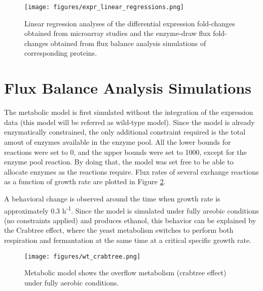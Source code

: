 \begin{figure}[H]
\begin{center}
\texttt{[image: figures/expr\_linear\_regressions.png]}
\caption[Linear regression analyses of the fold-changes]{Linear regression analyses of the differential expression fold-changes obtained from microarray studies and the enzyme-draw flux fold-changes obtained from flux balance analysis simulations of corresponding proteins.}
\end{center}
\label{fig:expr_linear_regressions}
\end{figure}



\section{Flux Balance Analysis Simulations}

The metabolic model is first simulated without the integration of the expression data (this model will be referred as wild-type model). Since the model is already enzymatically constrained, the only additional constraint required is the total amout of enzymes available in the enzyme pool. All the lower bounds for reactions were set to 0, and the upper bounds were set to 1000, except for the enzyme pool reaction. By doing that, the model was set free to be able to allocate enzymes as the reactions require. Flux rates of several exchange reactions as a function of growth rate are plotted in Figure \ref{fig:wt_crabtree}.

A behavioral change is observed around the time when growth rate is approximately 0.3 h\textsuperscript{-1}. Since the model is simulated under fully areobic conditions (no constraints applied) and produces ethanol, this behavior can be explained by the Crabtree effect, where the yeast metabolism switches to perform both respiration and fermantation at the same time at a critical specific growth rate.

\begin{figure}[H]
\begin{center}
\texttt{[image: figures/wt\_crabtree.png]}
\caption[Metabolic model shows the overflow metabolism]{Metabolic model shows the overflow metabolism (crabtree effect) under fully aerobic conditions.}
\end{center}
\label{fig:wt_crabtree}
\end{figure}
\vspace{-1.0cm}

